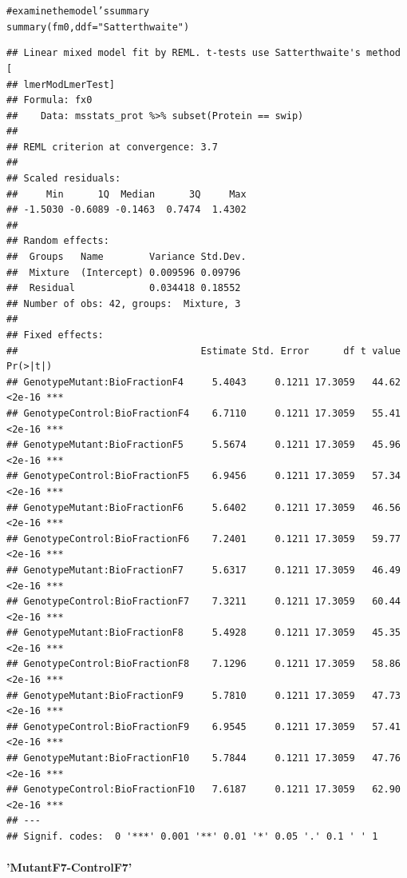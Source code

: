 \documentclass[11pt]{elife}\usepackage[]{graphicx}\usepackage[]{color}
\makeatletter
\newcommand{\hlstr}[1]{\textcolor[rgb]{0.063,0.58,0.627}{#1}}%
\newcommand{\hlcom}[1]{\textcolor[rgb]{0.588,0.588,0.588}{#1}}%
\newcommand{\hlstd}[1]{\textcolor[rgb]{0.196,0.196,0.196}{#1}}%
\newcommand{\hlkwc}[1]{\textcolor[rgb]{0,0.631,0.314}{#1}}%
\newcommand{\hlkwd}[1]{\textcolor[rgb]{0.78,0.227,0.412}{#1}}%
\newenvironment{kframe}{%
 \def\at@end@of@kframe{}%
 \ifinner\ifhmode%
  \def\at@end@of@kframe{\end{minipage}}%
  \begin{minipage}{\columnwidth}%
 \fi\fi%
 \def\FrameCommand##1{\hskip\@totalleftmargin \hskip-\fboxsep
 \colorbox{shadecolor}{##1}\hskip-\fboxsep
     \hskip-\linewidth \hskip-\@totalleftmargin \hskip\columnwidth}%
 \MakeFramed {\advance\hsize-\width
   \@totalleftmargin\z@ \linewidth\hsize
   \@setminipage}}%
 {\par\unskip\endMakeFramed%
 \at@end@of@kframe}
\newenvironment{knitrout}{}{} %
\makeatother
\begin{document}
\begin{knitrout}
\begin{kframe}
\begin{alltt}
\hlcom{# examine the model's summary}
\hlkwd{summary}\hlstd{(fm0,} \hlkwc{ddf} \hlstd{=} \hlstr{"Satterthwaite"}\hlstd{)}
\end{alltt}
\begin{verbatim}
## Linear mixed model fit by REML. t-tests use Satterthwaite's method [
## lmerModLmerTest]
## Formula: fx0
##    Data: msstats_prot %>% subset(Protein == swip)
## 
## REML criterion at convergence: 3.7
## 
## Scaled residuals: 
##     Min      1Q  Median      3Q     Max 
## -1.5030 -0.6089 -0.1463  0.7474  1.4302 
## 
## Random effects:
##  Groups   Name        Variance Std.Dev.
##  Mixture  (Intercept) 0.009596 0.09796 
##  Residual             0.034418 0.18552 
## Number of obs: 42, groups:  Mixture, 3
## 
## Fixed effects:
##                                Estimate Std. Error      df t value Pr(>|t|)    
## GenotypeMutant:BioFractionF4     5.4043     0.1211 17.3059   44.62   <2e-16 ***
## GenotypeControl:BioFractionF4    6.7110     0.1211 17.3059   55.41   <2e-16 ***
## GenotypeMutant:BioFractionF5     5.5674     0.1211 17.3059   45.96   <2e-16 ***
## GenotypeControl:BioFractionF5    6.9456     0.1211 17.3059   57.34   <2e-16 ***
## GenotypeMutant:BioFractionF6     5.6402     0.1211 17.3059   46.56   <2e-16 ***
## GenotypeControl:BioFractionF6    7.2401     0.1211 17.3059   59.77   <2e-16 ***
## GenotypeMutant:BioFractionF7     5.6317     0.1211 17.3059   46.49   <2e-16 ***
## GenotypeControl:BioFractionF7    7.3211     0.1211 17.3059   60.44   <2e-16 ***
## GenotypeMutant:BioFractionF8     5.4928     0.1211 17.3059   45.35   <2e-16 ***
## GenotypeControl:BioFractionF8    7.1296     0.1211 17.3059   58.86   <2e-16 ***
## GenotypeMutant:BioFractionF9     5.7810     0.1211 17.3059   47.73   <2e-16 ***
## GenotypeControl:BioFractionF9    6.9545     0.1211 17.3059   57.41   <2e-16 ***
## GenotypeMutant:BioFractionF10    5.7844     0.1211 17.3059   47.76   <2e-16 ***
## GenotypeControl:BioFractionF10   7.6187     0.1211 17.3059   62.90   <2e-16 ***
## ---
## Signif. codes:  0 '***' 0.001 '**' 0.01 '*' 0.05 '.' 0.1 ' ' 1
\end{verbatim}
\end{kframe}
\end{knitrout}

\paragraph{'MutantF7-ControlF7'}
\end{document}
